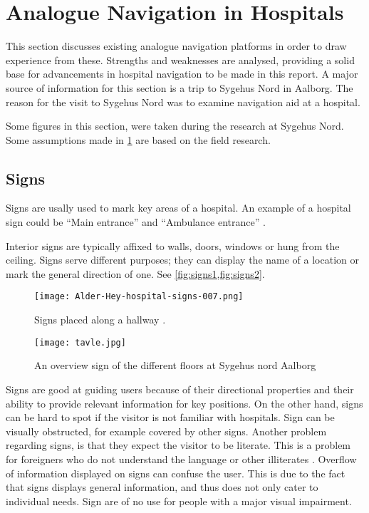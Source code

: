 \section{Analogue Navigation in Hospitals} %
\label{sec:anal_nav}

This section discusses existing analogue navigation platforms in order to draw experience from these. Strengths and weaknesses are analysed, providing a solid base for advancements in hospital navigation to be made in this report. A major source of information for this section is a trip to Sygehus Nord in Aalborg. The reason for the visit to Sygehus Nord was to examine navigation aid at a hospital.

Some figures in this section, were taken during the research at Sygehus Nord. Some assumptions made in \cref{sec:anal_nav} are based on the field research.

\subsection{Signs} \label{sub:sign}
Signs are usally used to mark key areas of a hospital. An example of a hospital sign could be \enquote{Main entrance} and \enquote{Ambulance entrance} \cite{signs_hospital,art_Osborne}.

Interior signs are typically affixed to walls, doors, windows or hung from the ceiling. Signs serve different purposes; they can display the name of a location or mark the general direction of one. See \cref{fig:signs1,fig:signs2}.

\begin{figure}[!h]
\centering
  \begin{minipage}{0.45\textwidth}
    \centering
    \texttt{[image: Alder-Hey-hospital-signs-007.png]}
    \caption{Signs placed along a hallway \cite{signs_hospital}.} \label{fig:signs1}
  \end{minipage}
  \hfill
  \begin{minipage}{0.45\textwidth}
    \centering
    \texttt{[image: tavle.jpg]}
    \caption{An overview sign of the different floors at Sygehus nord Aalborg} \label{fig:signs2}
  \end{minipage}
  \end{figure}

Signs are good at guiding users because of their directional properties and their ability to provide relevant information for key positions. On the other hand, signs can be hard to spot if the visitor is not familiar with hospitals. Sign can be visually obstructed, for example covered by other signs. Another problem regarding signs, is that they expect the visitor to be literate. This is a problem for foreigners who do not understand the language or other illiterates \cite{signs_reading}. Overflow of information displayed on signs can confuse the user. This is due to the fact that signs displays general information, and thus does not only cater to individual needs. Sign are of no use for people with a major visual impairment.




